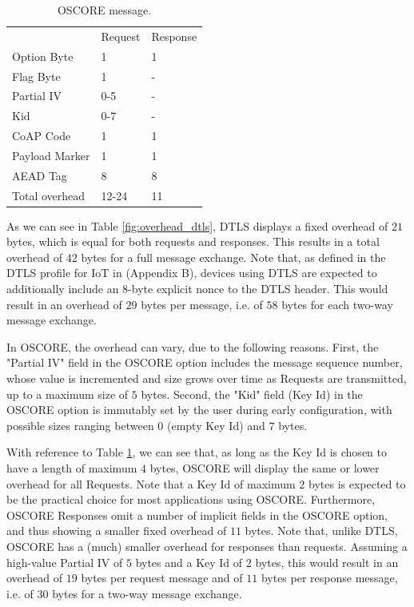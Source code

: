 {\begin{table}
{}
\hfill
\parbox[t]{.55\linewidth}{
\centering
\caption{OSCORE message.}
\label{fig:overhead_oscore}
\begin{tabular}{l|l|l}
                     & Request & Response \\
Option Byte   & 1    & 1\\
Flag Byte     & 1    & -\\
Partial IV           & 0-5  & -\\
Kid                  & 0-7  & -\\
CoAP Code            & 1    & 1\\
Payload Marker       & 1    & 1\\
AEAD Tag             & 8    &  8\\ \hline
Total overhead       & 12-24 & 11
\end{tabular}
}

\end{table}

As we can see in Table \ref{fig:overhead_dtls}, DTLS displays a fixed overhead of $21$ bytes, which is equal for both requests and responses. This results in a total overhead of $42$ bytes for a full message exchange. Note that, as defined in the DTLS profile for IoT in \cite{rfc7925} (Appendix B), devices using DTLS are expected to additionally include an $8$-byte explicit nonce to the DTLS header. This would result in an overhead of $29$ bytes per message, i.e. of $58$ bytes for each two-way message exchange.

In OSCORE, the overhead can vary, due to the following reasons. First, the "Partial IV" field in the OSCORE option includes the message sequence number, whose value is incremented and size grows over time as Requests are transmitted, up to a maximum size of $5$ bytes. Second, the "Kid" field (Key Id) in the OSCORE option is immutably set by the user during early configuration, with possible sizes ranging between $0$ (empty Key Id) and $7$ bytes. 

With reference to Table \ref{fig:overhead_oscore}, we can see that, as long as the Key Id is chosen to have a length of maximum $4$ bytes, OSCORE will display the same or lower overhead for all Requests. Note that a Key Id of maximum $2$ bytes is expected to be the practical choice for most applications using OSCORE. Furthermore, OSCORE Responses omit a number of implicit fields in the OSCORE option, and thus showing a smaller fixed overhead of $11$ bytes. Note that, unlike DTLS, OSCORE has a (much) smaller overhead for responses than requests. Assuming a high-value Partial IV of $5$ bytes and a Key Id of $2$ bytes, this would result in an overhead of $19$ bytes per request message and of $11$ bytes per response message, i.e. of $30$ bytes for a two-way message exchange.

}
